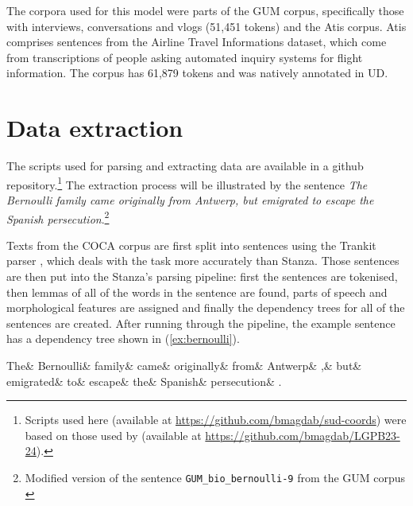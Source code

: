 The corpora used for this model were parts of the GUM corpus, specifically those with interviews, conversations and vlogs (51,451 tokens) and the Atis corpus. Atis comprises sentences from the Airline Travel Informations dataset, which come from transcriptions of people asking automated inquiry systems for flight information. The corpus has 61,879 tokens and was natively annotated in UD. 

\section{Data extraction}

The scripts used for parsing and extracting data are available in a github repository.\footnote{Scripts used here (available at \url{https://github.com/bmagdab/sud-coords}) were based on those used by \cite{prz:etal:24} (available at \url{https://github.com/bmagdab/LGPB23-24}).} The extraction process will be illustrated by the sentence \textsl{The Bernoulli family came originally from Antwerp, but emigrated to escape the Spanish persecution}.\footnote{Modified version of the sentence \texttt{GUM\_bio\_bernoulli-9} from the GUM corpus \citep{Zeldes2017}} 

Texts from the COCA corpus are first split into sentences using the Trankit parser \citep{nguyen2021trankit}, which deals with the task more accurately than Stanza. Those sentences are then put into the Stanza's parsing pipeline: first the sentences are tokenised, then lemmas of all of the words in the sentence are found, parts of speech and morphological features are assigned and finally the dependency trees for all of the sentences are created. After running through the pipeline, the example sentence has a dependency tree shown in (\ref{ex:bernoulli}). 

\begin{adjustwidth}{-90pt}{70pt}
\small
\begin{exe}
\ex\label{ex:bernoulli}
\begin{dependency}[baseline=-\the\dimexpr\fontdimen22\textfont2\relax]
	\begin{deptext}
		 The\& Bernoulli\& family\& came\& originally\& from\& Antwerp\& ,\& but\& emigrated\& to\& escape\& the\& Spanish\& persecution\& .\\
	 \end{deptext} 
\end{dependency}
\end{exe}
\end{adjustwidth}

